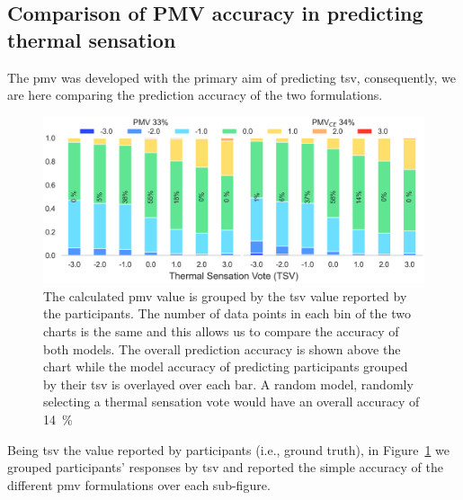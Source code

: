 \subsection{Comparison of PMV accuracy in predicting thermal sensation}\label{subsec:model-accuracy-comparison-in-predicting-thermal-sensation}
The \ac{pmv} was developed with the primary aim of predicting \ac{tsv}, consequently, we are here comparing the prediction accuracy of the two formulations.
\begin{figure}[htb!]
    \centering
    \includegraphics[width=\textwidth]{figures/bar_stacked_model_accuracy}
    \caption{The calculated \ac{pmv} value is grouped by the \ac{tsv} value reported by the participants. 
    The number of data points in each bin of the two charts is the same and this allows us to compare the accuracy of both models.
    The overall prediction accuracy is shown above the chart while the model accuracy of predicting participants grouped by their \ac{tsv} is overlayed over each bar. 
    A random model, randomly selecting a thermal sensation vote would have an overall accuracy of \qty{14}{\percent}}
    \label{fig:bar_stacked_model_accuracy}
\end{figure}
Being \ac{tsv} the value reported by participants (i.e., ground truth), in Figure~\ref{fig:bar_stacked_model_accuracy} we grouped participants' responses by \ac{tsv} and reported the simple accuracy of the different \ac{pmv} formulations over each sub-figure.
